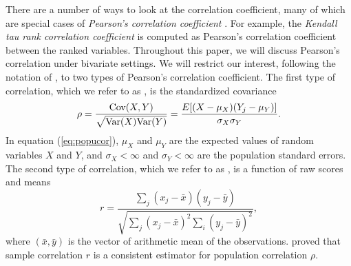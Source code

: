 	There are a number of ways to look at the correlation coefficient, many of which are special 
	cases of \textit{Pearson's correlation coefficient} 
	\citep{lee1988thirteen}. For example, the \textit{Kendall tau rank correlation coefficient} is 
	computed as Pearson's correlation coefficient between the ranked variables. Throughout this 
	paper, we will discuss Pearson's correlation under bivariate settings. We will restrict our 
	interest, following the notation of \citet{lee1988thirteen},  to two 
	types of Pearson's correlation coefficient. The first type of correlation, which we refer to as 
	\textit{\popucor}, is the standardized 
	covariance
	\begin{equation}\label{eq:popucor}
	\rho =\dfrac{\text{Cov}(X, Y)}{\sqrt{\text{Var}(X)\text{Var}(Y)}} = 
	\dfrac{E[(X-\mu_X)(Y_j-\mu_Y)]}{\sigma_X\sigma_Y}.
	\end{equation} 
	In equation (\ref{eq:popucor}), $\mu_X$ and $\mu_Y$ are the expected values of 
	random variables 
	$X$ and 
	$Y$,  and $\sigma_X<\infty$ and 
	$\sigma_Y<\infty$ are the population standard errors. The second type of correlation, which we 
	refer to as \textit{\samplecor}, is a function of raw scores and means
	\begin{equation}\label{eq:samplecor}
	r  =  \dfrac{\sum_j (x_j -\bar{x})(y_j - \bar{y})}{\sqrt{\sum_{j}(x_j - \bar{x})^2\sum_i(y_j - 
			\bar{y})^2}}, 
	\end{equation}
	where $(\bar{x}, \bar{y})$ is the vector of arithmetic mean of the observations. 
	\citet{fisher1915frequency} proved that sample correlation $r$ is a consistent 
	estimator for 
	population correlation $\rho$.
	
